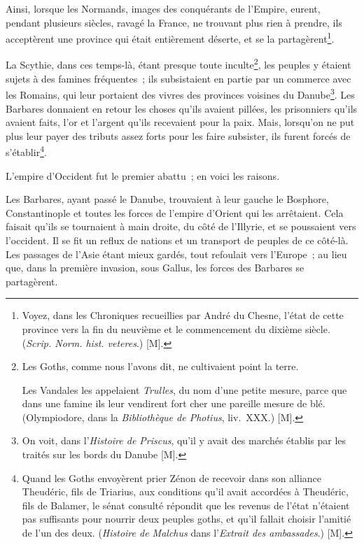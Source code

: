 \documentclass[french,twoside]{book} %
\begin{document}
Ainsi, lorsque les Normands, images des conquérants de l’Empire, eurent, pendant plusieurs siècles, ravagé la France, ne trouvant plus rien à prendre, ils acceptèrent une province qui était entièrement déserte, et se la partagèrent\footnote{Voyez, dans les Chroniques recueillies par André du Chesne, l’état de cette province vers la fin du neuvième et le commencement du dixième siècle. ({\itshape Scrip. Norm. hist. veteres}.) [M].}.\par
La Scythie, dans ces temps-là, étant presque toute inculte\footnote{\noindent Les Goths, comme nous l’avons dit, ne cultivaient point la terre.\par
Les Vandales les appelaient {\itshape Trulles}, du nom d’une petite mesure, parce que dans une famine ils leur vendirent fort cher une pareille mesure de blé. (Olympiodore, dans la {\itshape Bibliothèque de Photius}, liv. XXX.) [M].
}, les peuples y étaient sujets à des famines fréquentes ; ils subsistaient en partie par un commerce avec les Romains, qui leur portaient des vivres des provinces voisines du Danube\footnote{On voit, dans l’{\itshape Histoire de Priscus}, qu’il y avait des marchés établis par les traités sur les bords du Danube [M].}. Les Barbares donnaient en retour les choses qu’ils avaient pillées, les prisonniers qu’ils avaient faits, l’or et l’argent qu’ils recevaient pour la paix. Mais, lorsqu’on ne put plus leur payer des tributs assez forts pour les faire subsister, ils furent forcés de s’établir\footnote{Quand les Goths envoyèrent prier Zénon de recevoir dans son alliance Theudéric, fils de Triarius, aux conditions qu’il avait accordées à Theudéric, fils de Balamer, le sénat consulté répondit que les revenus de l’état n’étaient pas suffisants pour nourrir deux peuples goths, et qu’il fallait choisir l’amitié de l’un des deux. ({\itshape Histoire de Malchus} dans l’{\itshape Extrait des ambassades}.) [M].}.\par
L’empire d’Occident fut le premier abattu ; en voici les raisons.\par
Les Barbares, ayant passé le Danube, trouvaient à leur gauche le Bosphore, Constantinople et toutes les forces de l’empire d’Orient qui les arrêtaient. Cela faisait qu’ils se tournaient à main droite, du côté de l’Illyrie, et se poussaient vers l’occident. Il se fit un reflux de nations et un transport de peuples de ce côté-là. Les passages de l’Asie étant mieux gardés, tout refoulait vers l’Europe ; au lieu que, dans la première invasion, sous Gallus, les forces des Barbares se partagèrent.\par
\end{document}
